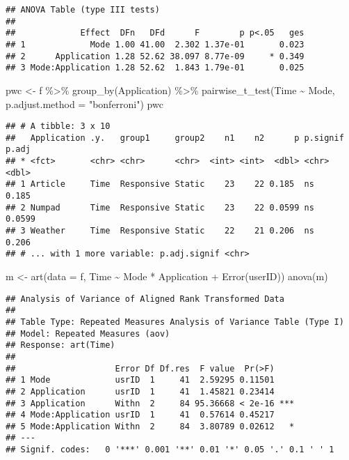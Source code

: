 \documentclass[
]{article}
\newenvironment{Shaded}{\begin{snugshade}}{\end{snugshade}}
\newcommand{\AttributeTok}[1]{\textcolor[rgb]{0.77,0.63,0.00}{#1}}
\newcommand{\FunctionTok}[1]{\textcolor[rgb]{0.00,0.00,0.00}{#1}}
\newcommand{\NormalTok}[1]{#1}
\newcommand{\OtherTok}[1]{\textcolor[rgb]{0.56,0.35,0.01}{#1}}
\newcommand{\SpecialCharTok}[1]{\textcolor[rgb]{0.00,0.00,0.00}{#1}}
\newcommand{\StringTok}[1]{\textcolor[rgb]{0.31,0.60,0.02}{#1}}
\begin{document}
\begin{verbatim}
## ANOVA Table (type III tests)
## 
##             Effect  DFn   DFd      F        p p<.05   ges
## 1             Mode 1.00 41.00  2.302 1.37e-01       0.023
## 2      Application 1.28 52.62 38.097 8.77e-09     * 0.349
## 3 Mode:Application 1.28 52.62  1.843 1.79e-01       0.025
\end{verbatim}

\begin{Shaded}
\begin{Highlighting}[]
\NormalTok{pwc }\OtherTok{\textless{}{-}}\NormalTok{ f }\SpecialCharTok{\%\textgreater{}\%} \FunctionTok{group\_by}\NormalTok{(Application) }\SpecialCharTok{\%\textgreater{}\%} \FunctionTok{pairwise\_t\_test}\NormalTok{(Time }\SpecialCharTok{\textasciitilde{}}\NormalTok{ Mode, }\AttributeTok{p.adjust.method =} \StringTok{"bonferroni"}\NormalTok{)}
\NormalTok{pwc}
\end{Highlighting}
\end{Shaded}

\begin{verbatim}
## # A tibble: 3 x 10
##   Application .y.   group1     group2    n1    n2      p p.signif  p.adj
## * <fct>       <chr> <chr>      <chr>  <int> <int>  <dbl> <chr>     <dbl>
## 1 Article     Time  Responsive Static    23    22 0.185  ns       0.185 
## 2 Numpad      Time  Responsive Static    23    22 0.0599 ns       0.0599
## 3 Weather     Time  Responsive Static    22    21 0.206  ns       0.206 
## # ... with 1 more variable: p.adj.signif <chr>
\end{verbatim}

\begin{Shaded}
\begin{Highlighting}[]
\NormalTok{m }\OtherTok{\textless{}{-}} \FunctionTok{art}\NormalTok{(}\AttributeTok{data =}\NormalTok{ f, Time }\SpecialCharTok{\textasciitilde{}}\NormalTok{ Mode }\SpecialCharTok{*}\NormalTok{ Application }\SpecialCharTok{+} \FunctionTok{Error}\NormalTok{(userID))}
\FunctionTok{anova}\NormalTok{(m)}
\end{Highlighting}
\end{Shaded}

\begin{verbatim}
## Analysis of Variance of Aligned Rank Transformed Data
## 
## Table Type: Repeated Measures Analysis of Variance Table (Type I) 
## Model: Repeated Measures (aov)
## Response: art(Time)
## 
##                    Error Df Df.res  F value  Pr(>F)    
## 1 Mode             usrID  1     41  2.59295 0.11501    
## 2 Application      usrID  1     41  1.45821 0.23414    
## 3 Application      Withn  2     84 95.36668 < 2e-16 ***
## 4 Mode:Application usrID  1     41  0.57614 0.45217    
## 5 Mode:Application Withn  2     84  3.80789 0.02612   *
## ---
## Signif. codes:   0 '***' 0.001 '**' 0.01 '*' 0.05 '.' 0.1 ' ' 1
\end{verbatim}
\end{document}
